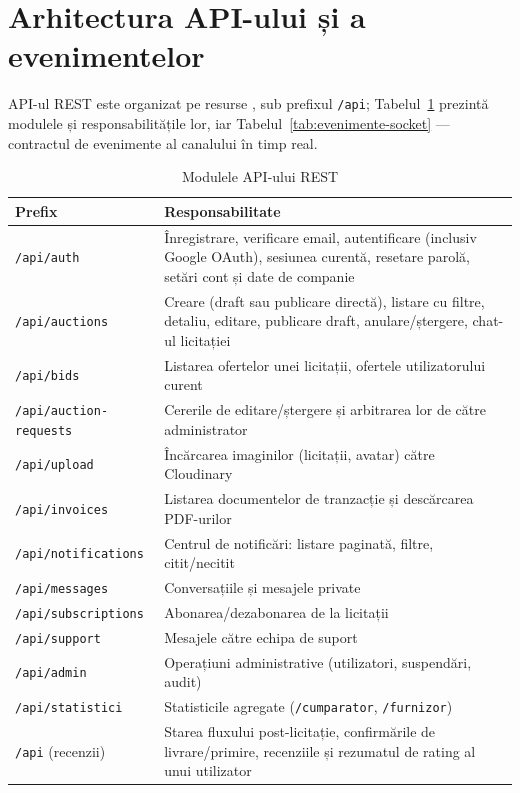 \section{Arhitectura API-ului și a evenimentelor}

API-ul REST este organizat pe resurse \cite{fielding2000}, sub prefixul \texttt{/api}; Tabelul~\ref{tab:module-api} prezintă modulele și responsabilitățile lor, iar Tabelul~\ref{tab:evenimente-socket} --- contractul de evenimente al canalului în timp real.

\begin{table}[!ht]\small\linespread{1}
\centering
\caption{Modulele API-ului REST}
\label{tab:module-api}
\begin{tabular}{l >{\raggedright\arraybackslash}p{10.6cm}}
\toprule
\textbf{Prefix} & \textbf{Responsabilitate} \\
\midrule
\texttt{/api/auth} & Înregistrare, verificare email, autentificare (inclusiv Google OAuth), sesiunea curentă, resetare parolă, setări cont și date de companie \\
\texttt{/api/auctions} & Creare (draft sau publicare directă), listare cu filtre, detaliu, editare, publicare draft, anulare/ștergere, chat-ul licitației \\
\texttt{/api/bids} & Listarea ofertelor unei licitații, ofertele utilizatorului curent \\
\texttt{/api/auction-requests} & Cererile de editare/ștergere și arbitrarea lor de către administrator \\
\texttt{/api/upload} & Încărcarea imaginilor (licitații, avatar) către Cloudinary \\
\texttt{/api/invoices} & Listarea documentelor de tranzacție și descărcarea PDF-urilor \\
\texttt{/api/notifications} & Centrul de notificări: listare paginată, filtre, citit/necitit \\
\texttt{/api/messages} & Conversațiile și mesajele private \\
\texttt{/api/subscriptions} & Abonarea/dezabonarea de la licitații \\
\texttt{/api/support} & Mesajele către echipa de suport \\
\texttt{/api/admin} & Operațiuni administrative (utilizatori, suspendări, audit) \\
\texttt{/api/statistici} & Statisticile agregate (\texttt{/cumparator}, \texttt{/furnizor}) \\
\texttt{/api} (recenzii) & Starea fluxului post-licitație, confirmările de livrare/primire, recenziile și rezumatul de rating al unui utilizator \\
\bottomrule
\end{tabular}
\end{table}

